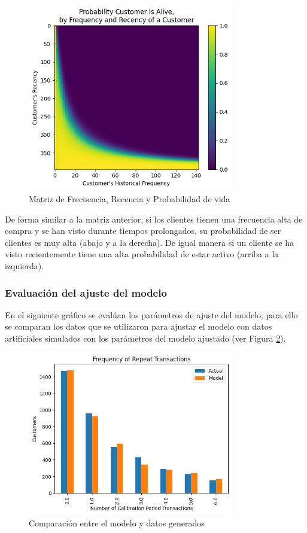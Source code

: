 \begin{figure}[H]
	\centering \includegraphics[width=0.80\textwidth]{images/probabilidad-vida.png}
	\caption{Matriz de Frecuencia, Recencia y Probabilidad de vida}
	\label{fig:frp}
\end{figure}

De forma similar a la matriz anterior, si los clientes tienen una frecuencia alta de compra y se han visto durante tiempos prolongados, su probabilidad de ser clientes es muy alta (abajo y a la derecha). De igual manera si un cliente se ha visto recientemente tiene una alta probabilidad de estar activo (arriba a la izquierda).

\subsubsection{Evaluación del ajuste del modelo}

En el siguiente gráfico se evalúan los parámetros de ajuste del modelo, para ello se comparan los datos que se utilizaron para ajustar el modelo con datos artificiales simulados con los parámetros del modelo ajustado (ver Figura \ref{fig:ajuste}).

\begin{figure}[H]
	\centering \includegraphics[width=0.80\textwidth]{images/ajuste-modelo.png}
	\caption{Comparación entre el modelo y datos generados}
	\label{fig:ajuste}
\end{figure}

